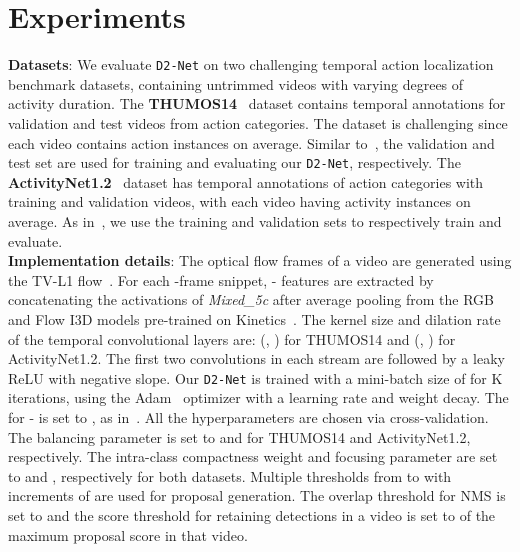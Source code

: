 \documentclass[final]{cvpr}
\def\proposed{\texttt{D2-Net}{}}
\begin{document}
\section{Experiments}
\noindent\textbf{Datasets}: We evaluate \proposed{} on two challenging temporal action localization benchmark datasets, containing untrimmed videos with varying degrees of activity duration. 
The \textbf{THUMOS14}~\cite{thumos14} dataset contains temporal annotations for  validation and  test videos from  action categories. The dataset is challenging since each video contains  action instances on average. Similar to~\cite{wtalc,autoloc,refineloc}, the validation and test set are used for training and evaluating our \proposed, respectively. 
The \textbf{ActivityNet1.2}~\cite{activitynet} dataset has temporal annotations of  action categories with  training and  validation videos, with each video having  activity instances on average. As in~\cite{autoloc,wtalc}, we use the training and validation sets to respectively train and evaluate. \\
\textbf{Implementation details}: The optical flow frames of a video are generated using the TV-L1 flow~\cite{tvl1-flow}. For each -frame snippet, - features are extracted by concatenating the activations of \emph{Mixed\_5c} after average pooling from the RGB and Flow I3D models pre-trained on Kinetics~\cite{kinetics}. The kernel size and dilation rate of the temporal convolutional layers are: (, ) for THUMOS14 and (, ) for ActivityNet1.2. The first two convolutions in each stream are followed by a leaky ReLU with  negative slope. Our \proposed{} is trained with a mini-batch size of  for K iterations, using the Adam~\cite{adam} optimizer with a  learning rate and  weight decay.
The  for - is set to , as in~\cite{wtalc,3cnet}.
All the hyperparameters are chosen via cross-validation. The balancing parameter  is set to  and  for THUMOS14 and ActivityNet1.2, respectively. The intra-class compactness weight  and focusing parameter  are set to  and , respectively for both datasets. Multiple thresholds from  to  with increments of  are used for proposal generation. The overlap threshold for NMS is set to  and the score threshold  for retaining detections in a video is set to  of the maximum proposal score in that video.
\end{document}
